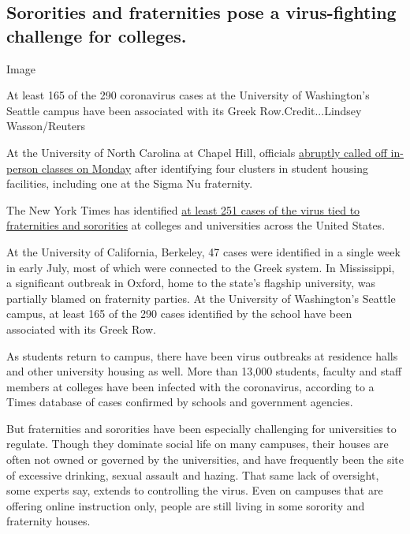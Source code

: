 \hypertarget{sororities-and-fraternities-pose-a-virus-fighting-challenge-for-colleges}{%
\subsection{Sororities and fraternities pose a virus-fighting challenge
for
colleges.}\label{sororities-and-fraternities-pose-a-virus-fighting-challenge-for-colleges}}

Image

At least 165 of the 290 coronavirus cases at the University of
Washington's Seattle campus have been associated with its Greek
Row.Credit...Lindsey Wasson/Reuters

At the University of North Carolina at Chapel Hill, officials
\href{https://www.nytimes3xbfgragh.onion/2020/08/17/us/unc-chapel-hill-covid.html}{abruptly
called off in-person classes on Monday} after identifying four clusters
in student housing facilities, including one at the Sigma Nu fraternity.

The New York Times has identified
\href{https://www.nytimes3xbfgragh.onion/2020/08/18/us/coronavirus-fraternities-sororities.html}{at
least 251 cases of the virus tied to fraternities and sororities} at
colleges and universities across the United States.

At the University of California, Berkeley, 47 cases were identified in a
single week in early July, most of which were connected to the Greek
system. In Mississippi, a significant outbreak in Oxford, home to the
state's flagship university, was partially blamed on fraternity parties.
At the University of Washington's Seattle campus, at least 165 of the
290 cases identified by the school have been associated with its Greek
Row.

As students return to campus, there have been virus outbreaks at
residence halls and other university housing as well. More than 13,000
students, faculty and staff members at colleges have been infected with
the coronavirus, according to a Times database of cases confirmed by
schools and government agencies.

But fraternities and sororities have been especially challenging for
universities to regulate. Though they dominate social life on many
campuses, their houses are often not owned or governed by the
universities, and have frequently been the site of excessive drinking,
sexual assault and hazing. That same lack of oversight, some experts
say, extends to controlling the virus. Even on campuses that are
offering online instruction only, people are still living in some
sorority and fraternity houses.

